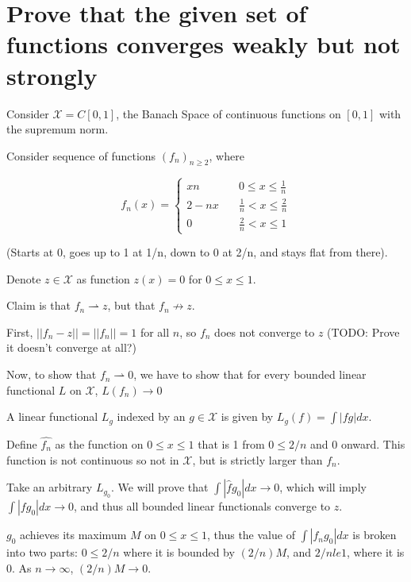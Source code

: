 \documentclass{article}
\begin{document}
\section{Prove that the given set of functions converges weakly but not strongly}

Consider $\mathscr{X} = C[0,1]$, the Banach Space of continuous functions on $[0,1]$ with the supremum norm.

Consider sequence of functions $(f_n)_{n \ge 2}$, where

$$
f_n(x) = \left\{
        \begin{array}{ll}
            xn & \quad 0 \leq x \leq \frac{1}{n} \\
            2 - nx & \quad \frac{1}{n} < x \leq \frac{2}{n} \\
            0 & \quad \frac{2}{n} < x \le 1
        \end{array}
    \right.
 $$
 
 
 
(Starts at 0, goes up to 1 at 1/n, down to 0 at 2/n, and stays flat from there).

Denote $z \in \mathscr{X}$ as function $z(x) = 0$ for $0 \le x \le 1$.

Claim is that $f_n \rightharpoonup z$, but that $f_n \not\rightarrow z$.

First, $|| f_n - z || = || f_n || = 1$ for all $n$, so $f_n$ does not converge to $z$ (TODO: Prove it doesn't converge at all?)

Now, to show that $f_n \rightharpoonup 0$, we have to show that for every bounded linear functional $L$ on $\mathscr{X}$, $L(f_n) \rightarrow 0$

A linear functional $L_g$ indexed by an $g \in \mathscr{X}$ is given by $L_g(f) = \int | f g | dx$.

Define $\hat{f_n}$ as the function on $0 \le x \le 1$ that is 1 from $0 \le 2/n$ and 0 onward. This function is not continuous so not in $\mathscr{X}$, but is strictly larger than $f_n$.

Take an arbitrary $L_{g_0}$. We will prove that $\int | \hat{f} g_0 | dx \rightarrow 0$, which will imply $\int | f g_0 | dx \rightarrow 0$, and thus all bounded linear functionals converge to $z$.

$g_0$ achieves its maximum $M$ on $0 \le x \le 1$, thus the value of $\int | f_n g_0 | dx$ is broken into two parts: $0 \le 2/n$ where it is bounded by $(2/n)M$, and $2/n le 1$, where it is $0$. As $n \rightarrow \infty$, $(2/n)M \rightarrow 0$.
\end{document}
